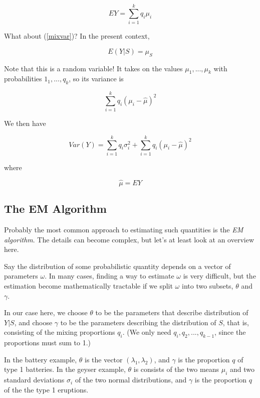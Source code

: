\documentclass[11pt]{article}
\begin{document}
\begin{equation}
\label{MMexpmean}
EY = \sum_{i=1}^k q_i \mu_i
\end{equation}

What about (\ref{mixvar})?  In the present context, 

\begin{equation}
E(Y|S) = \mu_S
\end{equation}

Note that this is a random variable!  It takes on the values
$\mu_1,...,\mu_k$ with probabilities $1_1,...,q_k$, so its variance is 

\begin{equation}
\sum_{i=1}^k q_i (\mu_i - \hat{\mu})^2
\end{equation}

We then have

\begin{equation}
Var(Y) =
\label{MMexpvar}
\sum_{i=1}^k q_i \sigma_i^2 +
\sum_{i=1}^k q_i (\mu_i - \hat{\mu})^2
\end{equation}

where

\begin{equation}
\hat{\mu} = EY
\end{equation}

\subsection{The EM Algorithm}
\label{emForMM}

Probably the most common approach to estimating such quantities is the
\textit{EM algorithm}.  The details can become complex, but let's at
least look at an overview here.  

Say the distribution of some probabilistic quantity depends on 
a vector of parameters $\omega$.  In many cases, finding a way to
estimate $\omega$ is very difficult, but the estimation become
mathematically tractable if we split $\omega$ into two subsets,
$\theta$ and $\gamma$. 

In our case here, we choose $\theta$ to be the parameters that describe
distribution of $Y|S$, and choose $\gamma$ to be the parameters
describing the distribution of $S$, that is, consisting of the mixing
proportions $q_i$.  (We only need $q_i,q_2,...,q_{k-1}$, since the
proportions must sum to 1.)

In the battery example, $\theta$ is the vector $(\lambda_1,\lambda_2)$,
and $\gamma$ is the proportion $q$ of type 1 batteries.  In the geyser
example, $\theta$ is consists of the two means $\mu_i$ and two standard
deviations $\sigma_i$ of the two normal distributions, and $\gamma$ is
the proportion $q$ of the the type 1 eruptions.  
\end{document}
